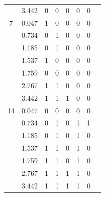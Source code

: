 \begin{table}[H]
\begin{center}
\begin{tabular}{cccccccc}
            &               3.442&           0        &           0        &           0        &           0        &           0        \\
           7&                   0.047&           1        &           0        &           0        &           0        &           0       \\ 
            &                  0.734&           0        &           1        &           0        &           0        &           0        \\
            &                1.185&           0        &           1        &           0        &           0        &           0        \\
            &                    1.537&           1        &           0        &           0        &           0        &           0        \\
            &                   1.759&           0        &           0        &           0        &           0        &           0        \\
            &                    2.767&           1        &           1        &           0        &           0        &           0        \\
            &                    3.442&           1        &           1        &           1        &           0        &           0        \\
          14&                   0.047&           0        &           0        &           0        &           0        &           0       \\ 
            &           0.734&           0        &           1        &           0        &           1        &           1        \\
            &          1.185&           0        &           1        &           0        &           1        &           0        \\
            &           1.537&           1        &           1        &           0        &           1        &           0        \\
            &           1.759&           1        &           1        &           0        &           1        &           0        \\
            &          2.767&           1        &           1        &           1        &           1        &           0        \\
            &          3.442&           1        &           1        &           1        &           1        &           0        \\
      \bottomrule
    \end{tabular}
  \end{center}
\end{table}


